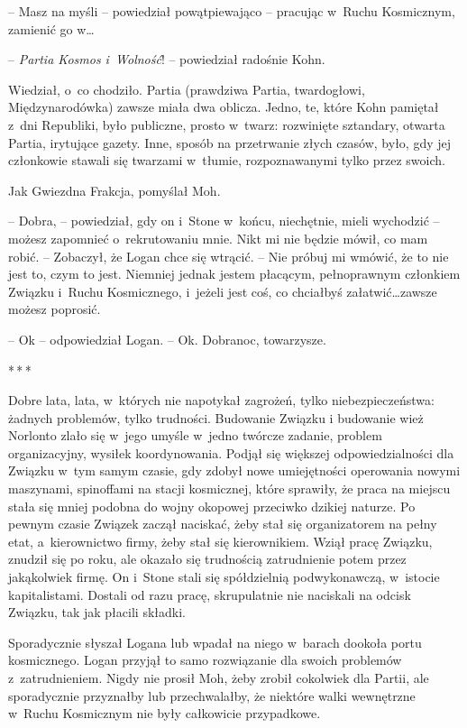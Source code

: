 \documentclass[oneside,polish,11pt,sfheadings]{mwbk}
\newcommand{\threeast}{\bigskip\par\centerline{*\,*\,*}\medskip\par}%
\begin{document}
-- Masz na myśli -- powiedział powątpiewająco -- pracując w~Ruchu Kosmicznym,
zamienić go w\ldots

-- \emph{Partia Kosmos i~Wolność}! -- powiedział radośnie Kohn.

Wiedział, o~co chodziło. Partia (prawdziwa Partia, twardogłowi,
Międzynarodówka) zawsze miała dwa oblicza. Jedno, te, które Kohn
pamiętał z~dni Republiki, było publiczne, prosto w~twarz: rozwinięte
sztandary, otwarta Partia, irytujące gazety. Inne, sposób na przetrwanie
złych czasów, było, gdy jej członkowie stawali się twarzami w~tłumie,
rozpoznawanymi tylko przez swoich.

Jak Gwiezdna Frakcja, pomyślał Moh.

-- Dobra, -- powiedział, gdy on i~Stone w~końcu, niechętnie, mieli
wychodzić -- możesz zapomnieć o~rekrutowaniu mnie. Nikt mi nie będzie
mówił, co mam robić. -- Zobaczył, że Logan chce się wtrącić. -- Nie próbuj
mi wmówić, że to nie jest to, czym to jest. Niemniej jednak jestem
płacącym, pełnoprawnym członkiem Związku i~Ruchu Kosmicznego, i~jeżeli
jest coś, co chciałbyś załatwić\ldots zawsze możesz poprosić.

-- Ok -- odpowiedział Logan. -- Ok. Dobranoc, towarzysze.

  \threeast 

Dobre lata, lata, w~których nie napotykał zagrożeń, tylko
niebezpieczeństwa: żadnych problemów, tylko trudności. Budowanie Związku
i budowanie wież Norlonto zlało się w~jego umyśle w~jedno twórcze
zadanie, problem organizacyjny, wysiłek koordynowania. Podjął się
większej odpowiedzialności dla Związku w~tym samym czasie, gdy zdobył
nowe umiejętności operowania nowymi maszynami, spinoffami na stacji
kosmicznej, które sprawiły, że praca na miejscu stała się mniej podobna
do wojny okopowej przeciwko dzikiej naturze. Po pewnym czasie Związek
zaczął naciskać, żeby stał się organizatorem na pełny etat, a~kierownictwo firmy, żeby stał się kierownikiem. Wziął pracę Związku,
znudził się po roku, ale okazało się trudnością zatrudnienie potem przez
jakąkolwiek firmę. On i~Stone stali się spółdzielnią podwykonawczą, w~istocie kapitalistami. Dostali od razu pracę, skrupulatnie nie naciskali
na odcisk Związku, tak jak płacili składki.

Sporadycznie słyszał Logana lub wpadał na niego w~barach dookoła portu
kosmicznego. Logan przyjął to samo rozwiązanie dla swoich problemów z~zatrudnieniem. Nigdy nie prosił Moh, żeby zrobił cokolwiek dla Partii,
ale sporadycznie przyznałby lub przechwalałby, że niektóre walki
wewnętrzne w~Ruchu Kosmicznym nie były całkowicie przypadkowe.
\end{document}
